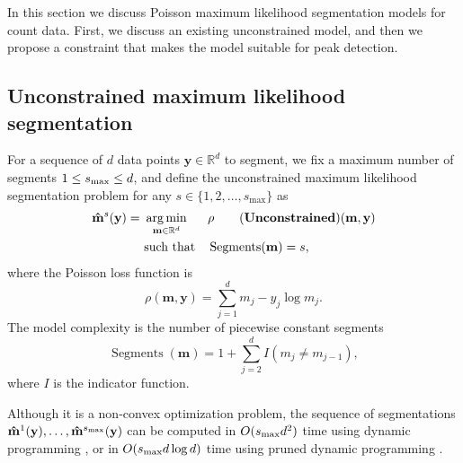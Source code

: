 \documentclass{article}
\DeclareMathOperator*{\argmin}{arg\,min}
\DeclareMathOperator*{\Segments}{Segments}
\newcommand{\RR}{\mathbb R}
\begin{document}
In this section we discuss Poisson maximum likelihood segmentation
models for count data. First, we discuss an existing unconstrained
model, and then we propose a constraint that makes the model suitable
for peak detection.

\subsection{Unconstrained maximum likelihood segmentation}

For a sequence of $d$ data points $\mathbf y\in\RR^d$ to segment, we
fix a maximum number of segments $1 \leq s_{\text{\text{max}}}\leq d$,
and define the unconstrained maximum likelihood segmentation problem
for any $s\in\{1, 2, \dots, s_{\max}\}$ as
\begin{align*}
  \label{unconstrained}
  \mathbf{\hat m}^s(\mathbf y)  =\ 
  &\argmin_{\mathbf m\in\RR^{d}} && 
  \rho
  \tag{\textbf{Unconstrained}}
  (\mathbf m, \mathbf y) \\
  &\text{such that} && \Segments(\mathbf m)=s,
\end{align*}
where the Poisson loss function is
\begin{equation}\label{eq:rho}
  \rho(\mathbf m, \mathbf y)= \sum_{j=1}^d m_j - y_j \log m_j.
\end{equation} 
The model complexity is the number of piecewise constant segments
\begin{equation}
  \Segments(\mathbf m)=1+\sum_{j=2}^d I(m_j \neq m_{j-1}),
\end{equation}
where $I$ is the indicator function. 

Although it is a non-convex optimization problem, the sequence of
segmentations $\mathbf{\hat m}^1(\mathbf y), \dots, \mathbf{\hat
  m}^{s_{\text{\text{max}}}}(\mathbf y)$ can be computed in
$O(s_{\text{\text{max}}} d^2)$ time using dynamic programming
\citep{bellman}, or in $O(s_{\text{\text{max}}} d \log d)$
time using pruned dynamic programming \citep{pruned-dp, Segmentor}.
\end{document}
